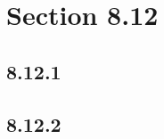 





\section*{Section 8.12}

\subsection*{8.12.1}
\begin{enumerate}
\end{enumerate}

\subsection*{8.12.2}
\begin{enumerate}
\end{enumerate}

